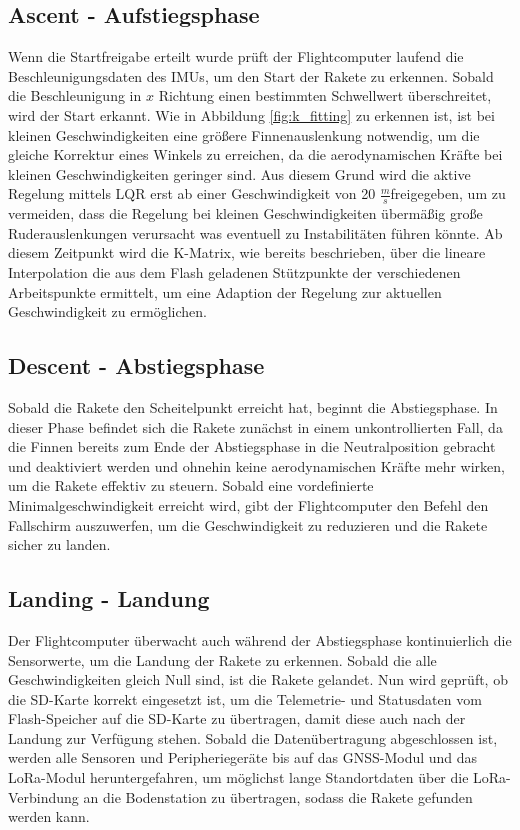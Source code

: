 \subsection{Ascent - Aufstiegsphase}
\label{subsec:ascent}
Wenn die Startfreigabe erteilt wurde prüft der Flightcomputer laufend die Beschleunigungsdaten des IMUs, um den Start der Rakete zu erkennen. Sobald die Beschleunigung in $x$ Richtung einen bestimmten Schwellwert überschreitet, wird der Start erkannt. Wie in Abbildung \ref{fig:k_fitting} zu erkennen ist, ist bei kleinen Geschwindigkeiten eine größere Finnenauslenkung notwendig, um die gleiche Korrektur eines Winkels zu erreichen, da die aerodynamischen Kräfte bei kleinen Geschwindigkeiten geringer sind. Aus diesem Grund wird die aktive Regelung mittels LQR erst ab einer Geschwindigkeit von 20 $\frac{m}{s}$freigegeben, um zu vermeiden, dass die Regelung bei kleinen Geschwindigkeiten übermäßig große Ruderauslenkungen verursacht was eventuell zu Instabilitäten führen könnte. Ab diesem Zeitpunkt wird die K-Matrix, wie bereits beschrieben, über die lineare Interpolation die aus dem Flash geladenen Stützpunkte der verschiedenen Arbeitspunkte ermittelt, um eine Adaption der Regelung zur aktuellen Geschwindigkeit zu ermöglichen.
\subsection{Descent - Abstiegsphase}
\label{subsec:descent}
Sobald die Rakete den Scheitelpunkt erreicht hat, beginnt die Abstiegsphase.
In dieser Phase befindet sich die Rakete zunächst in einem unkontrollierten Fall, da die Finnen bereits zum Ende der Abstiegsphase in die Neutralposition gebracht und deaktiviert werden und ohnehin keine aerodynamischen Kräfte mehr wirken, um die Rakete effektiv zu steuern. Sobald eine vordefinierte Minimalgeschwindigkeit erreicht wird, gibt der Flightcomputer den Befehl den Fallschirm auszuwerfen, um die Geschwindigkeit zu reduzieren und die Rakete sicher zu landen. 
\subsection{Landing - Landung}
\label{subsec:landing}
Der Flightcomputer überwacht auch während der Abstiegsphase kontinuierlich die Sensorwerte, um die Landung der Rakete zu erkennen. Sobald die alle Geschwindigkeiten gleich Null sind, ist die Rakete gelandet. Nun wird geprüft, ob die SD-Karte korrekt eingesetzt ist, um die Telemetrie- und Statusdaten vom Flash-Speicher auf die SD-Karte zu übertragen, damit diese auch nach der Landung zur Verfügung stehen. Sobald die Datenübertragung abgeschlossen ist, werden alle Sensoren und Peripheriegeräte bis auf das GNSS-Modul und das LoRa-Modul heruntergefahren, um möglichst lange Standortdaten über die LoRa-Verbindung an die Bodenstation zu übertragen, sodass die Rakete gefunden werden kann. 


